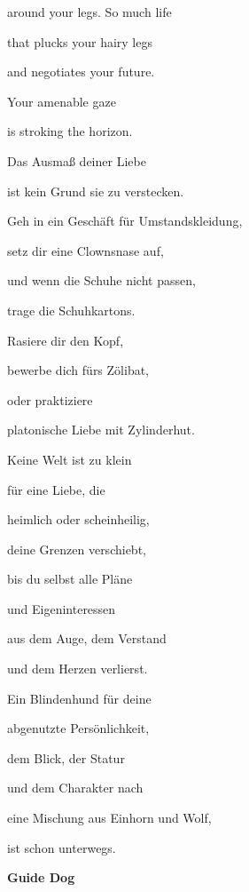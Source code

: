 \bigskip

around your legs. So much life

that plucks your hairy legs

and negotiates your future.

Your amenable gaze

is stroking the horizon.


\bigskip



\bigskip


\bigskip

Das Ausmaß deiner Liebe 

ist kein Grund sie zu verstecken.


\bigskip

Geh in ein Geschäft für Umstandskleidung,

setz dir eine Clownsnase auf,

und wenn die Schuhe nicht passen,

trage die Schuhkartons.


\bigskip

Rasiere dir den Kopf,

bewerbe dich fürs Zölibat,

oder praktiziere

platonische Liebe mit Zylinderhut.


\bigskip

Keine Welt ist zu klein

für eine Liebe, die

heimlich oder scheinheilig,

deine Grenzen verschiebt,


\bigskip

bis du selbst alle Pläne

und Eigeninteressen

aus dem Auge, dem Verstand

und dem Herzen verlierst.


\bigskip

Ein Blindenhund für deine

abgenutzte Persönlichkeit,

dem Blick, der Statur

und dem Charakter nach


\bigskip

eine Mischung aus Einhorn und Wolf,

ist schon unterwegs.

{\bfseries
Guide Dog}


